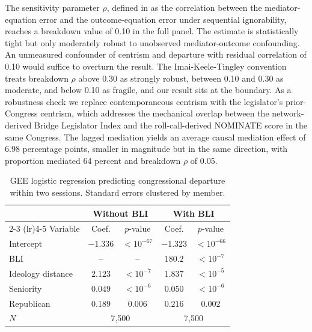 \documentclass[12pt, a4paper]{article}
\begin{document}
The sensitivity parameter $\rho$, defined in \citet{imai2010identification} as the correlation between the mediator-equation error and the outcome-equation error under sequential ignorability, reaches a breakdown value of 0.10 in the full panel. The estimate is statistically tight but only moderately robust to unobserved mediator-outcome confounding. An unmeasured confounder of centrism and departure with residual correlation of 0.10 would suffice to overturn the result. The Imai-Keele-Tingley convention treats breakdown $\rho$ above 0.30 as strongly robust, between 0.10 and 0.30 as moderate, and below 0.10 as fragile, and our result sits at the boundary. As a robustness check we replace contemporaneous centrism with the legislator's prior-Congress centrism, which addresses the mechanical overlap between the network-derived Bridge Legislator Index and the roll-call-derived NOMINATE score in the same Congress. The lagged mediation yields an average causal mediation effect of 6.98 percentage points, smaller in magnitude but in the same direction, with proportion mediated 64 percent and breakdown $\rho$ of 0.05.

\begin{table}[H]
\centering
\caption{GEE logistic regression predicting congressional departure within two sessions. Standard errors clustered by member.}
\label{tab:bli_regression}
\begin{tabular}{lcccc}
\toprule
 & \multicolumn{2}{c}{Without BLI} & \multicolumn{2}{c}{With BLI} \\
\cmidrule(lr){2-3} \cmidrule(lr){4-5}
Variable & Coef. & $p$-value & Coef. & $p$-value \\
\midrule
Intercept & $-1.336$ & $< 10^{-67}$ & $-1.323$ & $< 10^{-66}$ \\
BLI & -- & -- & $180.2$ & $< 10^{-7}$ \\
Ideology distance & $2.123$ & $< 10^{-7}$ & $1.837$ & $< 10^{-5}$ \\
Seniority & $0.049$ & $< 10^{-6}$ & $0.050$ & $< 10^{-6}$ \\
Republican & $0.189$ & $0.006$ & $0.216$ & $0.002$ \\
\midrule
$N$ & \multicolumn{2}{c}{7,500} & \multicolumn{2}{c}{7,500} \\
\bottomrule
\end{tabular}
\end{table}
\end{document}
